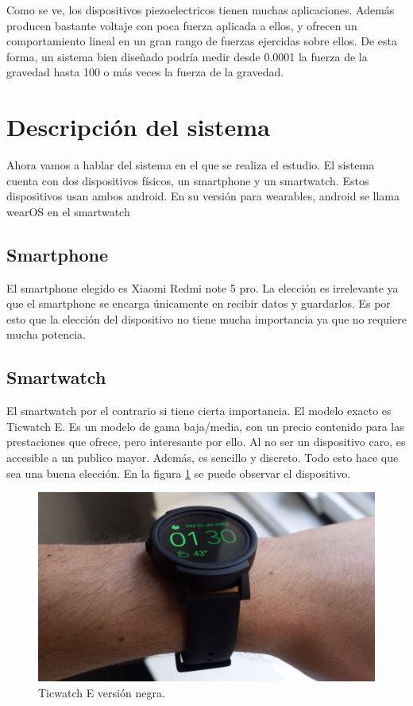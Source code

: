 \documentclass[12pt]{article}
\numberwithin{equation}{section}
\begin{document}
Como se ve, los dispositivos piezoelectricos tienen muchas aplicaciones. Además producen bastante voltaje con poca fuerza aplicada a ellos, y ofrecen un comportamiento lineal en un gran rango de fuerzas ejercidas sobre ellos. De esta forma, un sistema bien diseñado podría medir desde 0.0001 la fuerza de la gravedad hasta 100 o más veces la fuerza de la gravedad.
\newpage
\section{Descripción del sistema}
Ahora vamos a hablar del sistema en el que se realiza el estudio. El sistema cuenta con dos dispositivos físicos, un smartphone y un smartwatch. Estos dispositivos usan ambos android. En su versión para wearables, android se llama wearOS en el smartwatch
\subsection{Smartphone}
El smartphone elegido es Xiaomi Redmi note 5 pro. La elección es irrelevante ya que el smartphone se encarga únicamente en recibir datos y guardarlos. Es por esto que la elección del dispositivo no tiene mucha importancia ya que no requiere mucha potencia.
\subsection{Smartwatch}
El smartwatch por el contrario si tiene cierta importancia. El modelo exacto es Ticwatch E. Es un modelo de gama baja/media, con un precio contenido para las prestaciones que ofrece, pero interesante por ello. Al no ser un dispositivo caro, es accesible a un publico mayor. Además, es sencillo y discreto. Todo esto hace que sea una buena elección. En la figura \ref{fig:ticwatch} se puede observar el dispositivo.

\begin{figure}[h]
    \centering
    \includegraphics[width=1\textwidth]{ticwatche.jpg}
    \caption{Ticwatch E versión negra.}
    \label{fig:ticwatch}
\end{figure}
\end{document}
